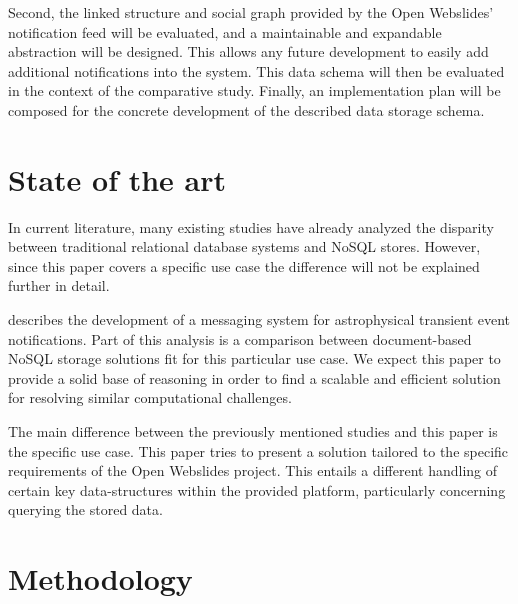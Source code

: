 \documentclass[fleqn,10pt]{voorstel}
\begin{document}
Second, the linked structure and social graph provided by the Open Webslides' notification feed will be evaluated, and a maintainable and expandable abstraction will be designed. This allows any future development to easily add additional notifications into the system.
This data schema will then be evaluated in the context of the comparative study. Finally, an implementation plan will be composed for the concrete development of the described data storage schema.


\section{State of the art}
\label{sec:state-of-the-art}

In current literature, many existing studies have already analyzed the disparity between traditional relational database systems and NoSQL stores. However, since this paper covers a specific use case the difference will not be explained further in detail.

\textcite{Zhao2015} describes the development of a messaging system for astrophysical transient event notifications. Part of this analysis is a comparison between document-based NoSQL storage solutions fit for this particular use case. We expect this paper to provide a solid base of reasoning in order to find a scalable and efficient solution for resolving similar computational challenges.

The main difference between the previously mentioned studies and this paper is the specific use case. This paper tries to present a solution tailored to the specific requirements of the Open Webslides project. This entails a different handling of certain key data-structures within the provided platform, particularly concerning querying the stored data.


\section{Methodology}
\label{sec:methodology}
\end{document}
